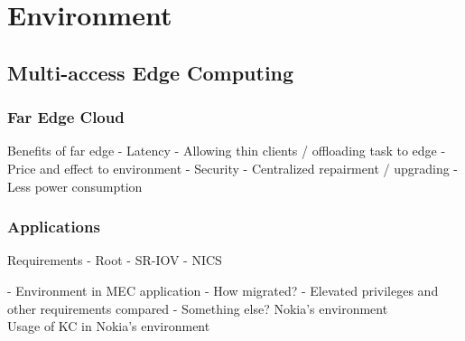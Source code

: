 \chapter{Environment}
\label{chapter:environment}

\section{Multi-access Edge Computing}

\subsection{Far Edge Cloud}

Benefits of far edge
    - Latency
    - Allowing thin clients / offloading task to edge
    - Price and effect to environment
    - Security
    - Centralized repairment / upgrading
    - Less power consumption

\subsection{Applications}

Requirements
- Root
- SR-IOV
- NICS

- Environment in MEC application
    - How migrated?
    - Elevated privileges and other requirements compared
    - Something else?
Nokia's environment \\
Usage of KC in Nokia's environment \\








